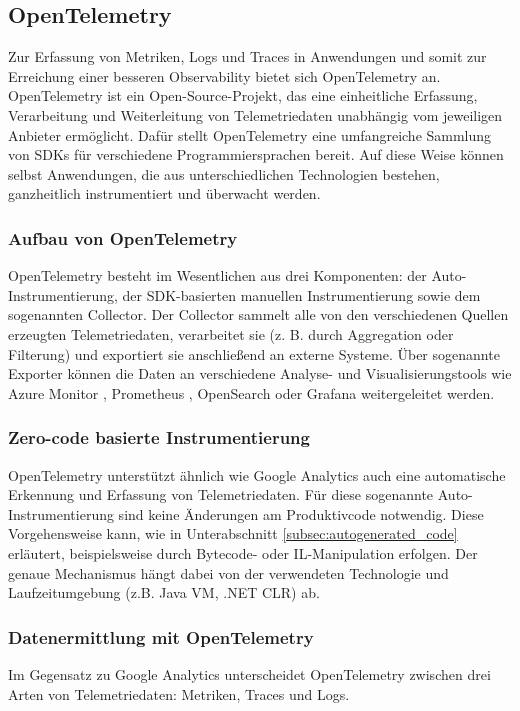 \subsection{OpenTelemetry}
\label{subsec:open_telemetry}
Zur Erfassung von Metriken, Logs und Traces in Anwendungen und somit zur Erreichung einer besseren Observability bietet sich OpenTelemetry \cite{opentelemetry_what_is} an. OpenTelemetry ist ein Open-Source-Projekt, das eine einheitliche Erfassung, Verarbeitung und Weiterleitung von Telemetriedaten unabhängig vom jeweiligen Anbieter ermöglicht. Dafür stellt OpenTelemetry eine umfangreiche Sammlung von SDKs für verschiedene Programmiersprachen bereit. Auf diese Weise können selbst Anwendungen, die aus unterschiedlichen Technologien bestehen, ganzheitlich instrumentiert und überwacht werden.

\subsubsection{Aufbau von OpenTelemetry}
OpenTelemetry besteht im Wesentlichen aus drei Komponenten: der Auto-Instrumentierung, der SDK-basierten manuellen Instrumentierung sowie dem sogenannten Collector. Der Collector sammelt alle von den verschiedenen Quellen erzeugten Telemetriedaten, verarbeitet sie (z. B. durch Aggregation oder Filterung) und exportiert sie anschließend an externe Systeme. Über sogenannte Exporter können die Daten an verschiedene Analyse- und Visualisierungstools wie Azure Monitor \cite{azure-monitor}, Prometheus \cite{prometheus}, OpenSearch \cite{opensearch} oder Grafana \cite{grafana} weitergeleitet werden.

\subsubsection{Zero-code basierte Instrumentierung}
OpenTelemetry unterstützt ähnlich wie Google Analytics auch eine automatische Erkennung und Erfassung von Telemetriedaten. Für diese sogenannte {Auto-Instrumentierung} sind keine Änderungen am Produktivcode notwendig. Diese Vorgehensweise kann, wie in Unterabschnitt \ref{subsec:autogenerated_code} erläutert, beispielsweise durch Bytecode- oder IL-Manipulation erfolgen. Der genaue Mechanismus hängt dabei von der verwendeten Technologie und Laufzeitumgebung (z.B. Java VM, .NET CLR) ab.

\subsubsection{Datenermittlung mit OpenTelemetry}
Im Gegensatz zu Google Analytics unterscheidet OpenTelemetry zwischen drei Arten von Telemetriedaten: Metriken, Traces und Logs.

